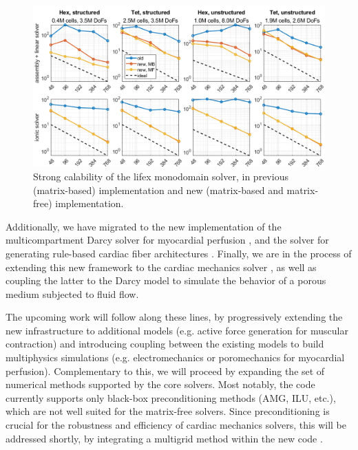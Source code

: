 \documentclass[a4paper,12pt]{article}
\begin{document}
\begin{figure}
  \centering

  \includegraphics[width=\textwidth]{polimi-lifex-scalability-ep.png}

  \caption{Strong calability of the lifex monodomain solver, in previous (matrix-based) implementation and new (matrix-based and matrix-free) implementation.}
  \label{fig:lifex-scalability-ep}
\end{figure}

Additionally, we have migrated to the new implementation of the multicompartment Darcy solver for myocardial perfusion \citep{zingaro2023comprehensive}, and the solver for generating rule-based cardiac fiber architectures \citep{piersanti2021modeling}. Finally, we are in the process of extending this new framework to the cardiac mechanics solver \citep{fedele2023comprehensive}, as well as coupling the latter to the Darcy model to simulate the behavior of a porous medium subjected to fluid flow.

The upcoming work will follow along these lines, by progressively extending the new infrastructure to additional models (e.g. active force generation for muscular contraction) and introducing coupling between the existing models to build multiphysics simulations (e.g. electromechanics or poromechanics for myocardial perfusion). Complementary to this, we will proceed by expanding the set of numerical methods supported by the core solvers. Most notably, the code currently supports only black-box preconditioning methods (AMG, ILU, etc.), which are not well suited for the matrix-free solvers. Since preconditioning is crucial for the robustness and efficiency of cardiac mechanics solvers, this will be addressed shortly, by integrating a multigrid method within the new code \citep{schussnig2025matrixfree}.
\end{document}
